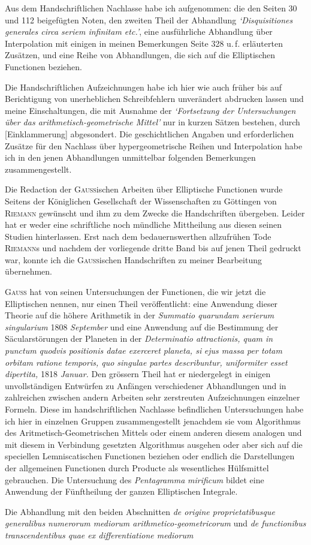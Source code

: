 Aus dem Handschriftlichen Nachlasse habe ich aufgenommen: die den Seiten 30 und 112 beigefügten Noten, den zweiten Theil der Abhandlung \textit{‘Disquisitiones generales circa seriem infinitam etc.’}, eine
ausführliche Abhandlung über Interpolation mit einigen in meinen Bemerkungen Seite 328 u.\,f. erläuterten
Zusätzen, und eine Reihe von Abhandlungen, die sich auf die Elliptischen Functionen beziehen.

Die Handschriftlichen Aufzeichnungen habe ich hier wie auch früher bis auf Berichtigung von unerheblichen Schreibfehlern unverändert abdrucken lassen und meine Einschaltungen, die mit Ausnahme der
\textit{‘Fortsetzung der Untersuchungen über das arithmetisch-geometrische Mittel’} nur in kurzen Sätzen bestehen,
durch [Einklammerung] abgesondert. Die geschichtlichen Angaben und erforderlichen Zusätze für den Nachlass über hypergeometrische Reihen und Interpolation habe ich in den jenen Abhandlungen unmittelbar
folgenden Bemerkungen zusammengestellt.

\bigskip
Die Redaction der \textsc{Gauss}ischen Arbeiten über Elliptische Functionen wurde Seitens der Königlichen
Gesellschaft der Wissenschaften zu Göttingen von \textsc{Riemann} gewünscht und ihm zu dem Zwecke die Handschriften übergeben. Leider hat er weder eine schriftliche noch mündliche Mittheilung aus diesen seinen
Studien hinterlassen. Erst nach dem bedauernswerthen allzufrühen Tode \textsc{Riemann}s und nachdem der vorliegende dritte Band bis auf jenen Theil gedruckt war, konnte ich die \textsc{Gauss}ischen Handschriften zu meiner Bearbeitung übernehmen.

\bigskip
\textsc{Gauss} hat von seinen Untersuchungen der Functionen, die wir jetzt die Elliptischen nennen, nur einen Theil veröffentlicht: eine Anwendung dieser Theorie auf die höhere Arithmetik in der \textit{Summatio quarundam serierum singularium} 1808 \textit{September} und eine Anwendung auf die Bestimmung der Säcularstörungen
der Planeten in der \textit{Determinatio attractionis, quam in punctum quodvis positionis datae exerceret planeta, si}
\textit{ejus massa per totam orbitam ratione temporis, quo singulae partes describuntur, uniformiter esset dipertita,} 1818
\textit{Januar.} Den grössern Theil hat er niedergelegt in einigen unvollständigen Entwürfen zu Anfängen verschiedener Abhandlungen und in zahlreichen zwischen andern Arbeiten sehr zerstreuten Aufzeichnungen einzelner
Formeln. Diese im handschriftlichen Nachlasse befindlichen Untersuchungen habe ich hier in einzelnen
Gruppen zusammengestellt jenachdem sie vom Algorithmus des Aritmetisch-Geometrischen Mittels oder einem anderen diesem analogen und mit diesem in Verbindung gesetzten Algorithmus ausgehen oder aber
sich auf die speciellen Lemniscatischen Functionen beziehen oder endlich die Darstellungen der allgemeinen
Functionen durch Producte als wesentliches Hülfsmittel gebrauchen. Die Untersuchung des \textit{Pentagramma}
\textit{mirificum} bildet eine Anwendung der Fünftheilung der ganzen Elliptischen Integrale.

\bigskip
Die Abhandlung mit den beiden Abschnitten \textit{de origine proprietatibusque generalibus numerorum mediorum arithmetico-geometricorum} und \textit{de functionibus transcendentibus quae ex differentiatione mediorum}
